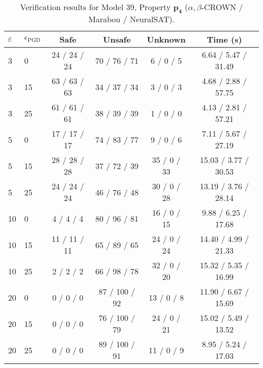 \begin{table}[htbp]\centering
\caption{\small Verification results for Model 39, Property $\mathbf{p_{4}}$ ($\alpha,\beta$-CROWN / Marabou / NeuralSAT).}
\label{tab:model39_p4}
\begin{tabular}{llcccc}
\toprule
$\varepsilon$ & $\epsilon_{\scriptscriptstyle\mathrm{PGD}}$ & Safe & Unsafe & Unknown & Time (s) \\
\midrule
3 & 0 & 24 / 24 / 24 & 70 / 76 / 71 & 6 / 0 / 5 & 6.64 / 5.47 / 31.49 \\
3 & 15 & 63 / 63 / 63 & 34 / 37 / 34 & 3 / 0 / 3 & 4.68 / 2.88 / 57.75 \\
3 & 25 & 61 / 61 / 61 & 38 / 39 / 39 & 1 / 0 / 0 & 4.13 / 2.81 / 57.21 \\
5 & 0 & 17 / 17 / 17 & 74 / 83 / 77 & 9 / 0 / 6 & 7.11 / 5.67 / 27.19 \\
5 & 15 & 28 / 28 / 28 & 37 / 72 / 39 & 35 / 0 / 33 & 15.03 / 3.77 / 30.53 \\
5 & 25 & 24 / 24 / 24 & 46 / 76 / 48 & 30 / 0 / 28 & 13.19 / 3.76 / 28.14 \\
10 & 0 & 4 / 4 / 4 & 80 / 96 / 81 & 16 / 0 / 15 & 9.88 / 6.25 / 17.68 \\
10 & 15 & 11 / 11 / 11 & 65 / 89 / 65 & 24 / 0 / 24 & 14.40 / 4.99 / 21.33 \\
10 & 25 & 2 / 2 / 2 & 66 / 98 / 78 & 32 / 0 / 20 & 15.32 / 5.35 / 16.99 \\
20 & 0 & 0 / 0 / 0 & 87 / 100 / 92 & 13 / 0 / 8 & 11.90 / 6.67 / 15.69 \\
20 & 15 & 0 / 0 / 0 & 76 / 100 / 79 & 24 / 0 / 21 & 15.02 / 5.49 / 13.52 \\
20 & 25 & 0 / 0 / 0 & 89 / 100 / 91 & 11 / 0 / 9 & 8.95 / 5.24 / 17.03 \\
\bottomrule
\end{tabular}
\end{table}
